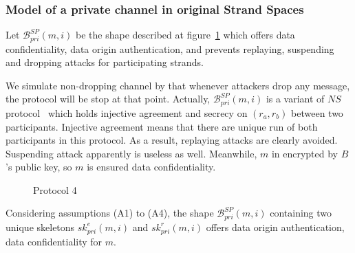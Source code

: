 \subsubsection*{Model of a private channel in original Strand Spaces}\label{private}

Let $\mathcal{B}^{SP}_{pri}(m,i)$ be the shape described at figure~\ref{protocol4} which offers data confidentiality, data origin authentication, and prevents replaying, suspending and dropping attacks for participating strands.

We simulate non-dropping channel by that whenever attackers drop any message, the protocol will be stop at that point. Actually, $\mathcal{B}^{SP}_{pri}(m,i)$ is a variant of $NS$ protocol~\cite{674832} which holds injective agreement and secrecy on $(r_a,r_b)$ between two participants. Injective agreement means that there are unique run of both participants in this protocol. As a result, replaying attacks are clearly avoided. Suspending attack apparently is useless as well. Meanwhile, $m$ in encrypted by $B$'s public key, so $m$ is ensured data confidentiality. 

\begin{figure}
\begin{center}
\end{center}
\caption{Protocol 4} 
\label{protocol4}
\end{figure}

\begin{Proposition}
Considering assumptions (A1) to (A4), the shape $\mathcal{B}^{SP}_{pri}(m,i)$ containing two unique skeletons $sk^e_{pri}(m,i)$ and $sk^r_{pri}(m,i)$ offers data origin authentication, data confidentiality for $m$.   
\end{Proposition}

